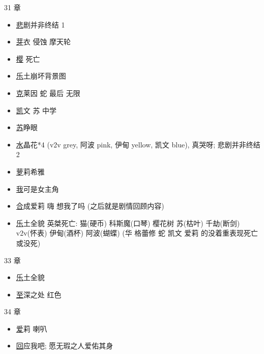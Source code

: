 \documentclass[a4paper]{article}
\begin{document}
31 章

\begin{itemize}
    \item \href{https://www.bilibili.com/video/BV1r94y1D7Ze/} 悲剧并非终结 1
    \item \href{https://www.bilibili.com/video/BV1r94y1D7Ze/?t=1566} 芽衣 侵蚀 摩天轮
    \item \href{https://www.bilibili.com/video/BV1r94y1D7Ze/?p=2&t=2571} 樱 死亡
    \item \href{https://www.bilibili.com/video/BV1r94y1D7Ze/?p=3&t=915} 乐土崩坏背景图
    \item \href{https://www.bilibili.com/video/BV1r94y1D7Ze/?p=4&t=1729} 克莱因 蛇 最后 无限
    \item \href{https://www.bilibili.com/video/BV1r94y1D7Ze/?p=4&t=2803} 凯文 苏 中学
    \item \href{https://www.bilibili.com/video/BV1r94y1D7Ze/?p=4&t=3865} 苏睁眼
    \item \href{https://www.bilibili.com/video/BV1r94y1D7Ze/?p=5&t=1865} 水晶花*4 (v2v grey, 阿波 pink, 伊甸 yellow, 凯文 blue), 真哭呀; 悲剧并非终结 2
    \item \href{https://www.bilibili.com/video/BV1r94y1D7Ze/?p=6&t=728} 萝莉希雅
    \item \href{https://www.bilibili.com/video/BV1r94y1D7Ze/?p=7&t=900} 我可是女主角
    \item \href{https://www.bilibili.com/video/BV1r94y1D7Ze/?p=7&t=1200} 合成爱莉 嗨 想我了吗 (之后就是剧情回顾内容)
    \item \href{https://www.bilibili.com/video/BV1r94y1D7Ze/?p=7&t=3850} 乐土全貌 英桀死亡: 猫(硬币) 科斯魔(口琴) 樱花树 苏(枯叶) 千劫(断剑) v2v(怀表) 伊甸(酒杯) 阿波(蝴蝶) (华 格蕾修 蛇 凯文 爱莉 的没着重表现死亡或没死)
\end{itemize}

33 章

\begin{itemize}
    \item \href{https://www.bilibili.com/video/BV1ZG4y1o7ie/?p=2&t=3333} 乐土全貌
    \item \href{https://www.bilibili.com/video/BV1ZG4y1o7ie/?p=2&t=3647} 至深之处 红色
\end{itemize}

34 章

\begin{itemize}
    \item \href{https://www.bilibili.com/video/BV1hK411r74y/?p=2&t=2380} 爱莉 喇叭
    \item \href{https://www.bilibili.com/video/BV1hK411r74y/?p=3&t=4084} 回应我吧; 愿无瑕之人爱佑其身
\end{itemize}
\end{document}
